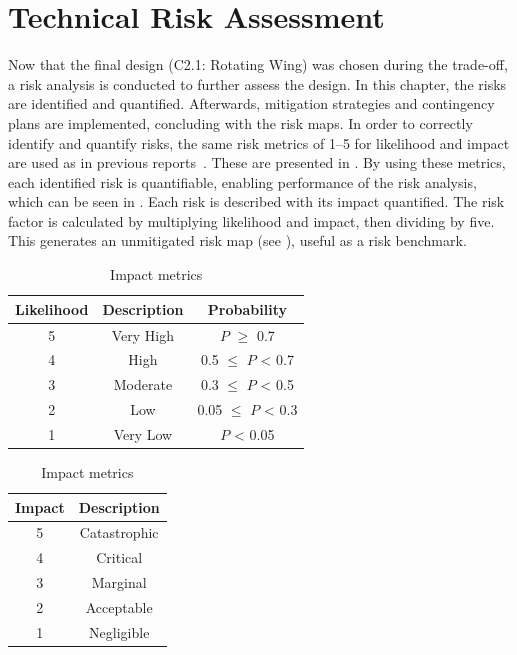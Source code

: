 \chapter{Technical Risk Assessment}
\label{chapter:TechRiskAnalysis}
Now that the final design (C2.1: Rotating Wing) was chosen during the trade-off, a risk analysis is conducted to further assess the design. In this chapter, the risks are identified and quantified.
Afterwards, mitigation strategies and contingency plans are implemented, concluding with the risk maps. In order to correctly identify and quantify risks, the same risk metrics of 1--5 for likelihood and impact are used as in previous reports~\cite{baselinerepo,ProjectPlan}. These are presented in . By using these metrics, each identified risk is quantifiable, enabling performance of the risk analysis, which can be seen in . Each risk is described with its impact quantified. The risk factor is calculated by multiplying likelihood and impact, then dividing by five. This generates an unmitigated risk map (see ), useful as a risk benchmark.

\begin{table}[ht]
    \centering
    \begin{minipage}{0.5\textwidth}
        \centering
        \caption{Likelihood metrics}
        \label{tab:likelihood_metrics}
        \begin{tabular}{ccc}
            \toprule
            \textbf{Likelihood} & \textbf{Description} & \textbf{Probability}         \\ \midrule
            5          & Very High   & $P$ $\geq$ 0.7         \\
            4          & High        & 0.5 $\leq$ $P$ < 0.7 \\
            3          & Moderate    & 0.3 $\leq$ $P$ < 0.5  \\
            2          & Low         & 0.05 $\leq$ $P$ < 0.3 \\
            1          & Very Low    &  $P$ < 0.05          \\ \bottomrule
        \end{tabular}
    \end{minipage}\hfill
    \begin{minipage}{0.5\textwidth}
        \centering
        \caption{Impact metrics}
        \label{tab:impact_metrics}
        \begin{tabular}{cc}
            \toprule
            \textbf{Impact} & \textbf{Description}  \\ \midrule
            5      & Catastrophic \\
            4      & Critical     \\
            3      & Marginal     \\
            2      & Acceptable   \\
            1      & Negligible   \\ \bottomrule
        \end{tabular}
    \end{minipage}
\end{table}

